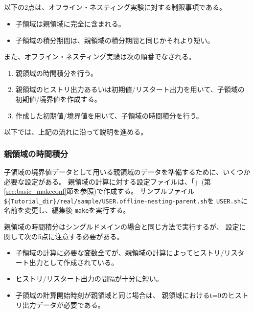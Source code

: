 \subsection{\SubsecOflineNesting} \label{subsec:nest_offline}

以下の2点は、オフライン・ネスティング実験に対する制限事項である。
\begin{itemize}
 \item 子領域は親領域に完全に含まれる。
 \item 子領域の積分期間は、親領域の積分期間と同じかそれより短い。
\end{itemize}
また、オフライン・ネスティング実験は次の順番でなされる。
\begin{enumerate}
 \item 親領域の時間積分を行う。
 \item 親領域のヒストリ出力あるいは初期値/リスタート出力を用いて、子領域の初期値/境界値を作成する。
 \item 作成した初期値/境界値を用いて、子領域の時間積分を行う。
\end{enumerate}
以下では、上記の流れに沿って説明を進める。

\subsubsection{親領域の時間積分}
子領域の境界値データとして用いる親領域のデータを準備するために、いくつか必要な設定がある。
親領域の計算に対する設定ファイルは、「\makeconftool」(第\ref{sec:basic_makeconf}節を参照)で作成する。
サンプルファイル\verb|${Tutorial_dir}/real/sample/USER.offline-nesting-parent.sh|を
\verb|USER.sh|に名前を変更し、編集後 \verb|make|を実行する。

親領域の時間積分はシングルドメインの場合と同じ方法で実行するが、
設定に関して次の5点に注意する必要がある。

\begin{itemize}
 \item 子領域の計算に必要な変数全てが、親領域の計算によってヒストリ/リスタート出力として作成されている。
 \item ヒストリ/リスタート出力の間隔が十分に短い。
 \item 子領域の計算開始時刻が親領域と同じ場合は、 親領域におけるt=0のヒストリ出力データが必要である。
\end{itemize}

